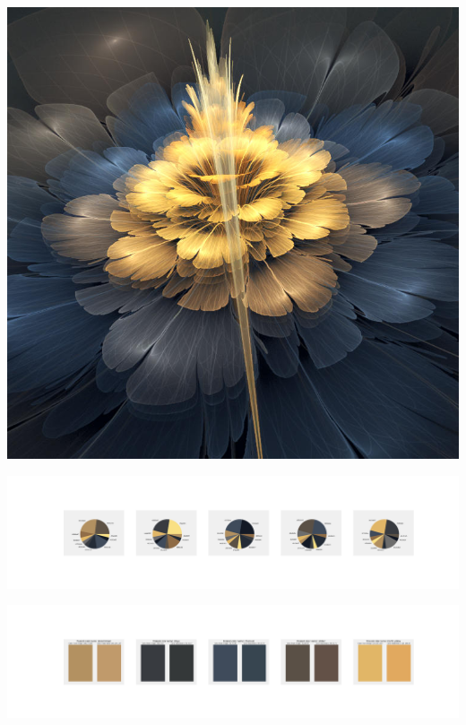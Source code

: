 \documentclass[11pt]{article}
\begin{document}
\begin{landscape}
    \begin{center}
    \includegraphics[width=\textwidth]{./nbimg/file (143).jpg}
    \end{center}

    \begin{center}
    \includegraphics[width=250mm]{./nbimg/pie-49.jpg}
    \end{center}

    \begin{center}
    \includegraphics[width=250mm]{./nbimg/peak-49.jpg}
    \end{center}
    


\end{landscape}
\end{document}
